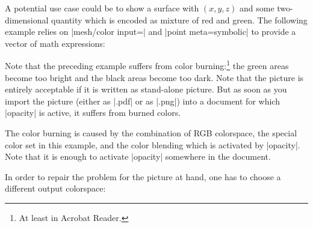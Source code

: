 {{A potential use case could be to show a surface with $(x,y,z)$ and some
two-dimensional quantity which is encoded as mixture of red and green. The
following example relies on
|mesh/color input=| and
|point meta=symbolic| to provide a vector of math expressions:
%
\pgfplotsexpensiveexample
\begin{codeexample}[]
\end{codeexample}
%
\noindent Note that the preceding example suffers from
color burning:\footnote{At least in Acrobat Reader.} the green areas become too
bright and the black areas become too dark. Note that the picture is entirely
acceptable if it is written as stand-alone picture. But as soon as you import
the picture (either as |.pdf| or as |.png|) into a document for which |opacity|
is active, it suffers from burned colors.

The color burning is caused by the combination of RGB colorspace, the special
color set in this example, and the color blending which is activated by
|opacity|. Note that it is enough to activate |opacity| somewhere in the
document.

In order to repair the problem for the picture at hand, one has to choose a
different output colorspace:

}}
